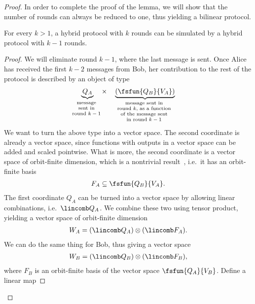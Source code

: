 \begin{proof}
    In order to complete the proof of the lemma, we will show that the number of rounds can always be reduced to one, thus yielding a bilinear protocol. 

    \begin{claim}\label{claim:reduce-round}
        For every $k > 1$, a hybrid protocol with $k$ rounds can be simulated by a hybrid protocol with $k-1$ rounds.
    \end{claim}
    \begin{proof}
        We will eliminate round $k-1$, where the last message is sent. Once Alice has received the first $k-2$ messages from Bob, her contribution to the rest of the protocol is described by an object of type 
          \begin{align}\label{eq:contribution-last-two-rounds}
            \myunderbrace{Q_A}{message \\ sent in \\ round $k-1$} \quad \times \quad  \myunderbrace{(\fsfun  {Q_B} {V_A})}{message sent in \\ round $k$, as a function \\ of the message sent \\ in  round $k-1$}
        \end{align}
        We want to turn the above type into a vector space. The second coordinate is already a vector space, since functions with outputs in a vector space can be added and scaled pointwise. What is more, the  second coordinate  is  a vector space of orbit-finite dimension, which is a nontrivial result~\cite[Section 8.3]{bojanczyk_slightly}, i.e.~it has an orbit-finite basis  
        \begin{align*}
        F_A \subseteq \fsfun  {Q_B} {V_A}.  
        \end{align*}
        The first coordinate $Q_A$ can be turned into a vector space by  allowing linear combinations, i.e.~$\lincomb Q_A$. We combine these two using tensor product, yielding a vector space of orbit-finite dimension
        \begin{align*}
           W_A =  (\lincomb Q_A) \otimes (\lincomb F_A).
        \end{align*}
        We can do the same thing for Bob, thus giving a vector space 
        \begin{align*}
           W_B =  (\lincomb Q_B) \otimes (\lincomb F_B),
        \end{align*}
        where $F_B$ is an orbit-finite basis of the vector space $\fsfun  {Q_A} {V_B}$. Define a linear map

\end{proof}
\end{proof}

